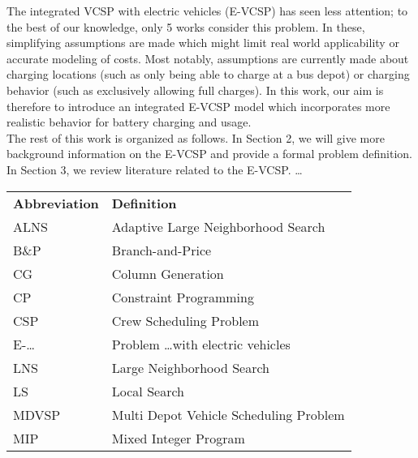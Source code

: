 \documentclass[]{article}
\begin{document}
The integrated VCSP with electric vehicles (E-VCSP) has seen less attention; to the best of our knowledge, only 5 works consider this problem. In these, simplifying assumptions are made which might limit real world applicability or accurate modeling of costs. Most notably, assumptions are currently made about charging locations (such as only being able to charge at a bus depot) or charging behavior (such as exclusively allowing full charges). In this work, our aim is therefore to introduce an integrated E-VCSP model which incorporates more realistic behavior for battery charging and usage. \\
The rest of this work is organized as follows. In Section 2, we will give more background information on the E-VCSP and provide a formal problem definition. In Section 3, we review literature related to the E-VCSP. \dots
\begin{table}
  \centering
  \begin{tabular}{ll}
    \toprule
    \multicolumn{1}{l}{\textbf{Abbreviation}} & \multicolumn{1}{l}{\textbf{Definition}}               \\
    \cmidrule(lr){1-1}\cmidrule(lr){2-2}
    ALNS                                      & Adaptive Large Neighborhood Search                   \\
    B\&P                                      & Branch-and-Price                                      \\
    CG                                        & Column Generation                                     \\
    CP                                        & Constraint Programming                                \\
    CSP                                       & Crew Scheduling Problem                               \\
    E-\dots                                   & Problem \dots with electric vehicles                  \\
    LNS                                       & Large Neighborhood Search                            \\
    LS                                        & Local Search                                          \\
    MDVSP                                     & Multi Depot Vehicle Scheduling Problem                \\
    MIP                                       & Mixed Integer Program                                 \\

\end{tabular}
\end{table}
\end{document}
